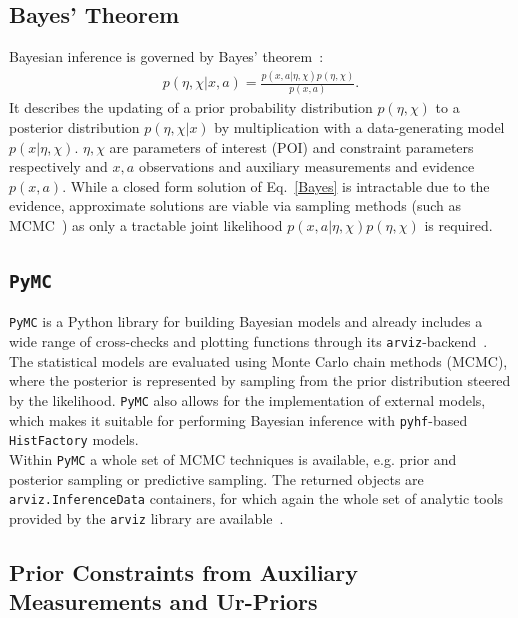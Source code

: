 \subsection{Bayes' Theorem}
Bayesian inference is governed by Bayes' theorem~\cite{ConjPriorsBerkeley}:
    \begin{align} \label{Bayes}
        p(\eta, \chi \vert x, a) = \frac{p(x, a\vert \eta, \chi) p(\eta, \chi)}{p(x, a)}.
    \end{align}
 \noindent It describes the updating of a prior probability distribution $p(\eta, \chi)$ to a posterior distribution $p(\eta, \chi \vert x)$ by multiplication with a data-generating model $p(x \vert \eta, \chi)$. $\eta, \chi$ are parameters of interest (POI) and constraint parameters respectively and $x, a$ observations and auxiliary measurements and evidence $p(x, a)$. While a closed form solution of Eq.~\eqref{Bayes} is intractable due to the evidence, approximate solutions are viable via sampling methods (such as MCMC~\cite{PyMC}) as only a tractable joint likelihood $p(x, a \vert \eta, \chi)p(\eta, \chi)$ is required.

\subsection{\texttt{PyMC}}
\texttt{PyMC} is a Python library for building Bayesian models and already includes a wide range of cross-checks and plotting functions through its \texttt{arviz}-backend~\cite{PyMC, arviz}. \\
\noindent The statistical models are evaluated using Monte Carlo chain methods (MCMC), where the posterior is represented by sampling from the prior distribution steered by the likelihood.
\noindent \texttt{PyMC} also allows for the implementation of external models, which makes it suitable for performing Bayesian inference with \texttt{pyhf}-based \texttt{HistFactory} models. \\
Within \texttt{PyMC} a whole set of MCMC techniques is available, e.g. prior and posterior sampling or predictive sampling. The returned objects are \texttt{arviz.InferenceData} containers, for which again the whole set of analytic tools provided by the \texttt{arviz} library are available~\cite{arviz}.


\subsection{Prior Constraints from Auxiliary Measurements and Ur-Priors}


